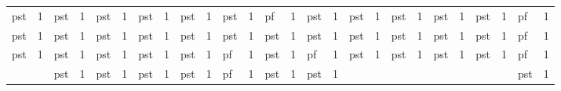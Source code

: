 \begin{table}[H]
\begin{center}
\begin{tabular}{llllllllllllllllllllllllll}
\rowcolor[HTML]{9AFF99} 
pst                       & 1 & pst                         & 1                         & pst                         & 1                         & pst                         & 1                         & pst                         & 1                         & pst                         & 1                         & pf                          & 1                         & pst                         & 1                         & pst        & 1        & pst         & 1         & pst          & 1         & pst         & 1         & \cellcolor[HTML]{FFCCC9}pf  & 1                         \\
\rowcolor[HTML]{9AFF99} 
pst                       & 1 & pst                         & 1                         & pst                         & 1                         & pst                         & 1                         & pst                         & 1                         & pst                         & 1                         & pst                         & 1                         & pst                         & 1                         & pst        & 1        & pst         & 1         & pst          & 1         & pst         & 1         & \cellcolor[HTML]{FFCCC9}pf  & 1                         \\
\rowcolor[HTML]{9AFF99} 
pst                       & 1 & pst                         & 1                         & pst                         & 1                         & pst                         & 1                         & pst                         & 1                         & pf                          & 1                         & pst                         & 1                         & \cellcolor[HTML]{FFCCC9}pf  & 1                         & pst        & 1        & pst         & 1         & pst          & 1         & pst         & 1         & \cellcolor[HTML]{FFCCC9}pf  & 1                         \\
                          &   & \cellcolor[HTML]{9AFF99}pst & \cellcolor[HTML]{9AFF99}1 & \cellcolor[HTML]{9AFF99}pst & \cellcolor[HTML]{9AFF99}1 & \cellcolor[HTML]{9AFF99}pst & \cellcolor[HTML]{9AFF99}1 & \cellcolor[HTML]{9AFF99}pst & \cellcolor[HTML]{9AFF99}1 & \cellcolor[HTML]{FFCCC9}pf  & \cellcolor[HTML]{9AFF99}1 & \cellcolor[HTML]{9AFF99}pst & \cellcolor[HTML]{9AFF99}1 & \cellcolor[HTML]{9AFF99}pst & \cellcolor[HTML]{9AFF99}1 &            &          &             &           &              &           &             &           & \cellcolor[HTML]{9AFF99}pst & \cellcolor[HTML]{9AFF99}1 \\

\end{tabular}
\end{center}
\end{table}
